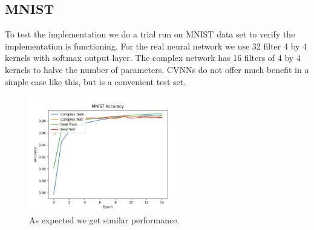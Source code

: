 \documentclass{article}
\begin{document}
\subsection{MNIST}
To test the implementation we do a trial run on MNIST data set to verify the implementation is functioning. For the real neural network we use 32 filter 4 by 4 kernels with softmax output layer. The complex network has 16 filters of 4 by 4 kernels to halve the number of parameters. CVNNs do not offer much benefit in a simple case like this, but is a convenient test set.
\begin{figure}[h]
  \centering
  \includegraphics[width=0.6\textwidth]{../figs/combined.png}
  \caption{As expected we get similar performance.}
\end{figure}

\end{document}
